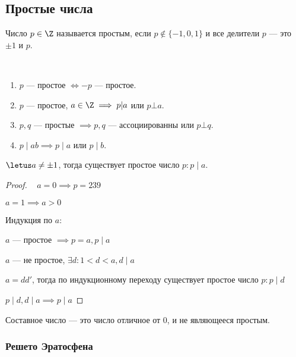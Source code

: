\subsection{Простые числа}

\begin{defn}
    Число $p \in \Z$ называется простым, если $p \notin \{-1, 0, 1\}$ и все делители $p$ --- это $\pm 1$ и $p$.
\end{defn}

\begin{prop}~
    \begin{enumerate}
        \item $p$ --- простое $\iff -p$ --- простое.
        
        \item $p$ --- простое, $a \in \Z \implies p | a$ или $p \bot a$.
        
        \item $p, q$ --- простые $\implies p, q$ --- ассоциированны или $p \bot q$.
        
        \item $p \mid ab \implies p \mid a$ или $p \mid b$. 
    \end{enumerate}
\end{prop}

\begin{theorem-non}
    $\letus a \neq \pm 1$, тогда существует простое число $p : p \mid a$.
\end{theorem-non}

\begin{proof}~
    $a = 0 \implies p = 239$
    
    $a = 1 \implies a > 0$
    
    Индукция по $a$:
    
    $a$ --- простое $\implies p = a, p \mid a$
    
    $a$ --- не простое, $\exists d : 1 < d < a, d \mid a$
    
    $a = dd'$, тогда по индукционному переходу существует простое число $p : p \mid d$
    
    $p \mid d, d \mid a \implies p \mid a$
\end{proof}

\begin{defn}
    Составное число --- это число отличное от 0, и не являющееся простым.
\end{defn}

\subsubsection*{Решето Эратосфена}

